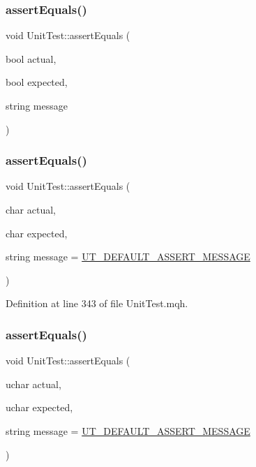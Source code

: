 \subsubsection{\texorpdfstring{assert\+Equals()}{assertEquals()}\hspace{0.1cm}{\footnotesize\ttfamily [1/28]}}
{\footnotesize\ttfamily void Unit\+Test\+::assert\+Equals (\begin{DoxyParamCaption}\item[{bool}]{actual,  }\item[{bool}]{expected,  }\item[{string}]{message }\end{DoxyParamCaption})}

\mbox{\label{class_unit_test_a515bb3599a7b1e2cc1eba6d9b29bc5cb}} 
\subsubsection{\texorpdfstring{assert\+Equals()}{assertEquals()}\hspace{0.1cm}{\footnotesize\ttfamily [2/28]}}
{\footnotesize\ttfamily void Unit\+Test\+::assert\+Equals (\begin{DoxyParamCaption}\item[{char}]{actual,  }\item[{char}]{expected,  }\item[{string}]{message = {\ttfamily \mbox{\hyperlink{_unit_test_8mqh_a96f5d62188d09039ebc3f443c9120e39}{U\+T\+\_\+\+D\+E\+F\+A\+U\+L\+T\+\_\+\+A\+S\+S\+E\+R\+T\+\_\+\+M\+E\+S\+S\+A\+GE}}} }\end{DoxyParamCaption})}



Definition at line 343 of file Unit\+Test.\+mqh.

\mbox{\label{class_unit_test_a2c4e53109218d9ae41d8e0d5fbd6a2d7}} 
\subsubsection{\texorpdfstring{assert\+Equals()}{assertEquals()}\hspace{0.1cm}{\footnotesize\ttfamily [3/28]}}
{\footnotesize\ttfamily void Unit\+Test\+::assert\+Equals (\begin{DoxyParamCaption}\item[{uchar}]{actual,  }\item[{uchar}]{expected,  }\item[{string}]{message = {\ttfamily \mbox{\hyperlink{_unit_test_8mqh_a96f5d62188d09039ebc3f443c9120e39}{U\+T\+\_\+\+D\+E\+F\+A\+U\+L\+T\+\_\+\+A\+S\+S\+E\+R\+T\+\_\+\+M\+E\+S\+S\+A\+GE}}} }\end{DoxyParamCaption})}



